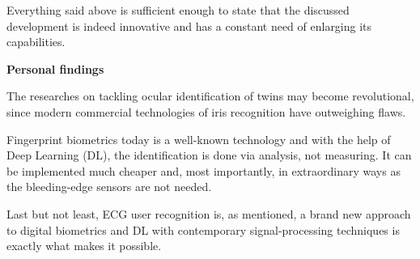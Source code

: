 \documentclass[a4paper, 12pt]{article}
\begin{document}
Everything said above is sufficient enough to state that the discussed development is indeed innovative and has a constant need of enlarging its capabilities.

\clearpage

\Large \textbf{Personal findings}
\bigbreak
\large 

The researches on tackling ocular identification of twins may become revolutional, since modern commercial technologies of iris recognition have outweighing flaws. 

Fingerprint biometrics today is a well-known technology and with the help of Deep Learning (DL), the identification is done via analysis, not measuring. It can be implemented much cheaper and, most importantly, in extraordinary ways as the bleeding-edge sensors are not needed.

Last but not least, ECG user recognition is, as mentioned, a brand new approach to digital biometrics and DL with contemporary signal-processing techniques is exactly what makes it possible.
\end{document}
